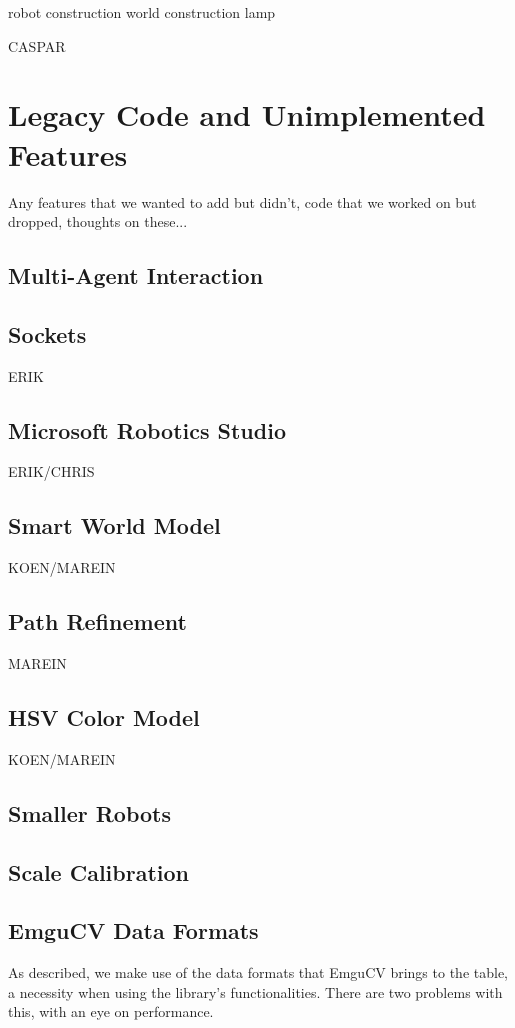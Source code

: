 \documentclass[10pt,twocolumn]{scrartcl}
\begin{document}
robot construction
world construction
lamp

CASPAR

\section{Legacy Code and Unimplemented Features}
Any features that we wanted to add but didn't, code that we worked on but dropped, thoughts on these...

\subsection{Multi-Agent Interaction}

\subsection{Sockets}
ERIK

\subsection{Microsoft Robotics Studio}
ERIK/CHRIS

\subsection{Smart World Model}
KOEN/MAREIN

\subsection{Path Refinement}
MAREIN

\subsection{HSV Color Model}
KOEN/MAREIN

\subsection{Smaller Robots}

\subsection{Scale Calibration}

\subsection{EmguCV Data Formats}
As described, we make use of the data formats that EmguCV brings to the table, a necessity when using the library's functionalities. There are two problems with this, with an eye on performance.
\end{document}
